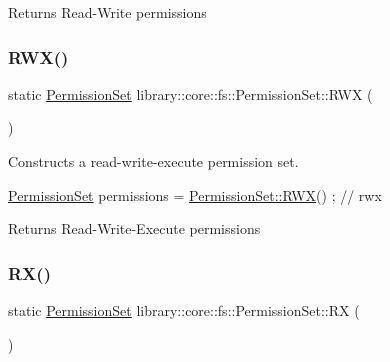 \begin{DoxyReturn}{Returns}
Read-\/\+Write permissions 
\end{DoxyReturn}
\mbox{\label{classlibrary_1_1core_1_1fs_1_1PermissionSet_afa3f9d07a7053240ae97c587543cdb00}} 
\subsubsection{\texorpdfstring{R\+W\+X()}{RWX()}}
{\footnotesize\ttfamily static \hyperlink{classlibrary_1_1core_1_1fs_1_1PermissionSet}{Permission\+Set} library\+::core\+::fs\+::\+Permission\+Set\+::\+R\+WX (\begin{DoxyParamCaption}{ }\end{DoxyParamCaption})\hspace{0.3cm}{\ttfamily [static]}}



Constructs a read-\/write-\/execute permission set. 


\begin{DoxyCode}
\hyperlink{classlibrary_1_1core_1_1fs_1_1PermissionSet_a8a6eb39cc2a8bca92a657d065d3e36ba}{PermissionSet} permissions = \hyperlink{classlibrary_1_1core_1_1fs_1_1PermissionSet_afa3f9d07a7053240ae97c587543cdb00}{PermissionSet::RWX}() ; \textcolor{comment}{// rwx}
\end{DoxyCode}


\begin{DoxyReturn}{Returns}
Read-\/\+Write-\/\+Execute permissions 
\end{DoxyReturn}
\mbox{\label{classlibrary_1_1core_1_1fs_1_1PermissionSet_ab632d79f1b8b8f4577bc06fa622b1c09}} 
\subsubsection{\texorpdfstring{R\+X()}{RX()}}
{\footnotesize\ttfamily static \hyperlink{classlibrary_1_1core_1_1fs_1_1PermissionSet}{Permission\+Set} library\+::core\+::fs\+::\+Permission\+Set\+::\+RX (\begin{DoxyParamCaption}{ }\end{DoxyParamCaption})\hspace{0.3cm}{\ttfamily [static]}}



